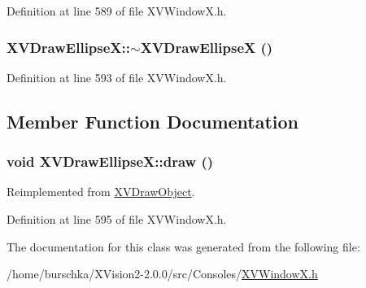 Definition at line 589 of file XVWindow\-X.h.\label{XVDrawEllipseX_a1}
\hypertarget{class_XVDrawEllipseX_a1}{
\subsubsection[~XVDrawEllipseX]{\setlength{\rightskip}{0pt plus 5cm}XVDraw\-Ellipse\-X::$\sim$XVDraw\-Ellipse\-X ()}}




Definition at line 593 of file XVWindow\-X.h.

\subsection{Member Function Documentation}
\label{XVDrawEllipseX_a2}
\hypertarget{class_XVDrawEllipseX_a2}{
\subsubsection[draw]{\setlength{\rightskip}{0pt plus 5cm}void XVDraw\-Ellipse\-X::draw ()}}




Reimplemented from \hyperlink{class_XVDrawObject}{XVDraw\-Object}.

Definition at line 595 of file XVWindow\-X.h.

The documentation for this class was generated from the following file:\begin{CompactItemize}
\item 
/home/burschka/XVision2-2.0.0/src/Consoles/\hyperlink{XVWindowX.h-source}{XVWindow\-X.h}\end{CompactItemize}

